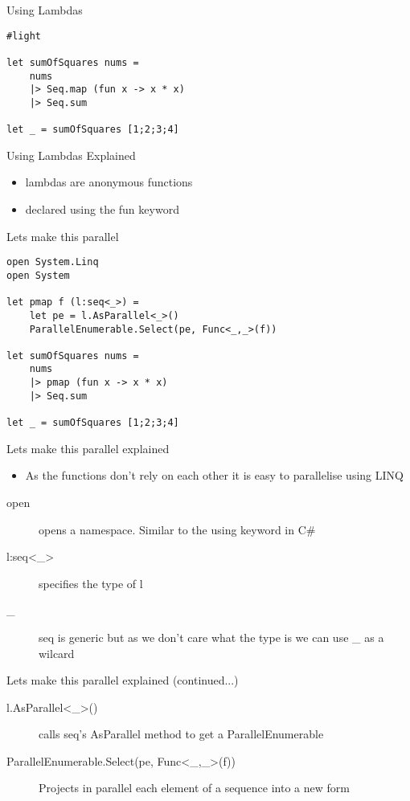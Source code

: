 \documentclass[landscape]{slides}
\begin{document}
\begin{slide}{Using Lambdas}
\begin{verbatim}
#light

let sumOfSquares nums =
    nums 
    |> Seq.map (fun x -> x * x) 
    |> Seq.sum

let _ = sumOfSquares [1;2;3;4]
\end{verbatim}
\end{slide}

\begin{slide}{Using Lambdas Explained}
\begin{itemize}
\item lambdas are anonymous functions
\item declared using the fun keyword
\end{itemize}
\end{slide}

\begin{slide}{Lets make this parallel}
\begin{verbatim}
open System.Linq
open System

let pmap f (l:seq<_>) =
    let pe = l.AsParallel<_>()
    ParallelEnumerable.Select(pe, Func<_,_>(f))

let sumOfSquares nums =
    nums
    |> pmap (fun x -> x * x) 
    |> Seq.sum

let _ = sumOfSquares [1;2;3;4]
\end{verbatim}
\end{slide}

\begin{slide}{Lets make this parallel explained}
\begin{itemize}
\item As the functions don't rely on each other it is easy to parallelise using LINQ
\end{itemize}
\begin{description}
\item[open] opens a namespace. Similar to the using keyword in C\#
\item[l:seq\textless\_\textgreater] specifies the type of l
\item[\_] seq is generic but as we don't care what the type is we can use \_ as a wilcard
\end{description}
\end{slide}

\begin{slide}{Lets make this parallel explained (continued...)}
\begin{description}
\item[l.AsParallel\textless\_\textgreater()] calls seq's AsParallel method to get a ParallelEnumerable
\item[ParallelEnumerable.Select(pe, Func\textless\_,\_\textgreater(f))] Projects in parallel each element of a sequence into a new form
\end{description}
\end{slide}
\end{document}
